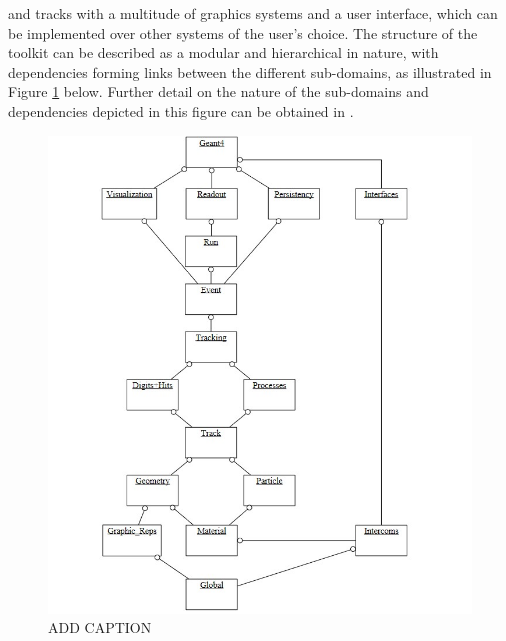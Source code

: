 and tracks with a multitude of graphics systems and a user interface, which can be implemented over other systems of the user's choice. The structure of the toolkit can be described as a modular and hierarchical in nature, with dependencies forming links between the different sub-domains,
as illustrated in Figure \ref{Geant4Structure} below. Further detail on the nature of the sub-domains and dependencies depicted in this figure can be obtained in \cite{GEANT4:2002zbu}.
\begin{figure}[H]
    \centering
    \includegraphics[scale=0.6]{Geant4Structure.jpg}
    \caption{ADD CAPTION}
    \label{Geant4Structure}
\end{figure}
